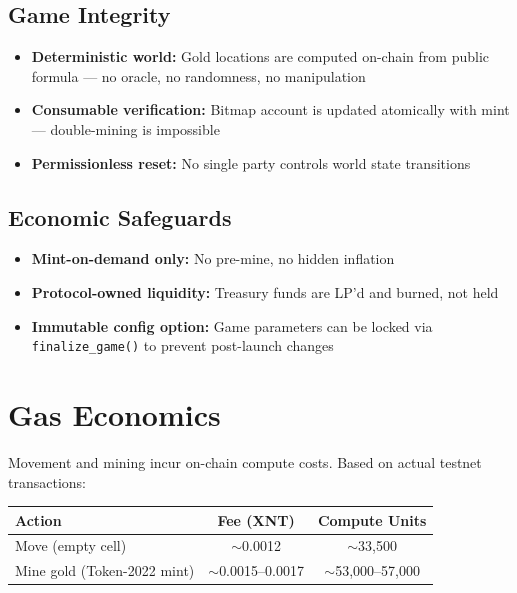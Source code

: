 \documentclass[11pt,a4paper]{article}
\begin{document}
\subsection{Game Integrity}

\begin{itemize}[leftmargin=2em]
\item \textbf{Deterministic world:} Gold locations are computed on-chain from public formula --- no oracle, no randomness, no manipulation
\item \textbf{Consumable verification:} Bitmap account is updated atomically with mint --- double-mining is impossible
\item \textbf{Permissionless reset:} No single party controls world state transitions
\end{itemize}

\subsection{Economic Safeguards}

\begin{itemize}[leftmargin=2em]
\item \textbf{Mint-on-demand only:} No pre-mine, no hidden inflation
\item \textbf{Protocol-owned liquidity:} Treasury funds are LP'd and burned, not held
\item \textbf{Immutable config option:} Game parameters can be locked via \texttt{finalize\_game()} to prevent post-launch changes
\end{itemize}

\section{Gas Economics}

Movement and mining incur on-chain compute costs. Based on actual testnet transactions:

\begin{table}[h]
\centering
\begin{tabular}{@{}lcc@{}}
\toprule
Action & Fee (XNT) & Compute Units \\
\midrule
Move (empty cell) & $\sim$0.0012 & $\sim$33,500 \\
Mine gold (Token-2022 mint) & $\sim$0.0015--0.0017 & $\sim$53,000--57,000 \\
\bottomrule
\end{tabular}
\end{table}
\end{document}
